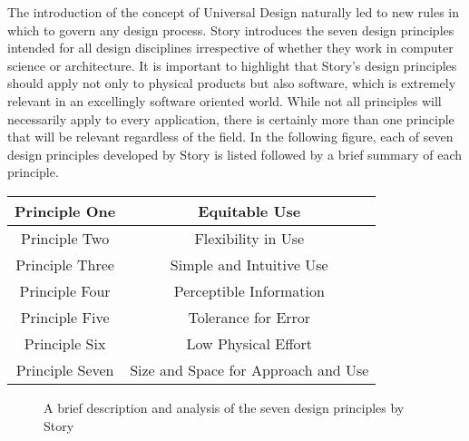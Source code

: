 The introduction of the concept of Universal Design naturally led to new rules in which to govern any design process. %
Story introduces the seven design principles \cite{sevenprinciples} intended for all design disciplines irrespective of whether they work in computer science or architecture.
It is important to highlight that Story's design principles should apply not only to physical products but also software, which is extremely relevant in an excellingly software oriented world.
While not all principles will necessarily apply to every application, there is certainly more than one principle that will be relevant regardless of the field.
In the following figure, each of seven design principles developed by Story is listed followed by a brief summary of each principle.

\begin{center}
    \begin{tabular}{ |c|c| } %
     \hline
     Principle One & Equitable Use \cite{sevenprinciples} \\
     \hline
     Principle Two & Flexibility in Use \cite{sevenprinciples} \\ 
     \hline
     Principle Three & Simple and Intuitive Use \cite{sevenprinciples} \\ 
     \hline
     Principle Four & Perceptible Information \cite{sevenprinciples} \\
     \hline 
     Principle Five & Tolerance for Error \cite{sevenprinciples} \\ 
     \hline
     Principle Six & Low Physical Effort \cite{sevenprinciples} \\ 
     \hline
     Principle Seven & Size and Space for Approach and Use \cite{sevenprinciples} \\
     \hline
    \end{tabular}
\end{center}

\begin{figure}
    \caption{A brief description and analysis of the seven design principles by Story \cite{sevenprinciples}} %
    \label{fig:DesignPrinciples}
\end{figure}

